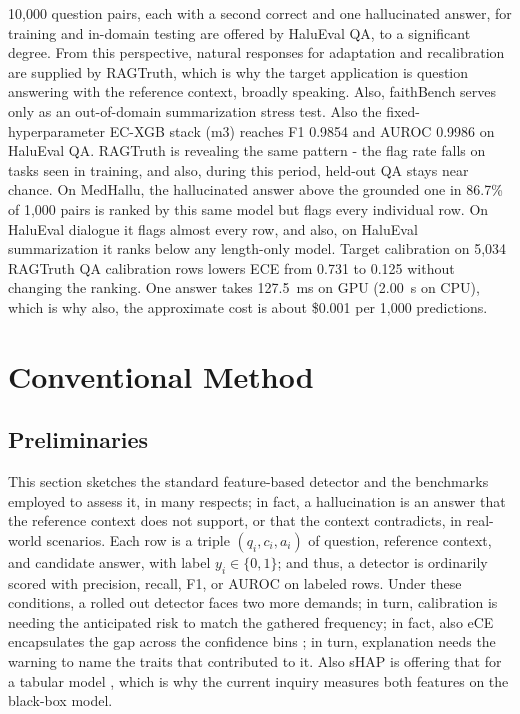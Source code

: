 \documentclass[a4paper,fleqn]{cas-sc}
\begin{document}
10,000 question pairs, each with a second correct and one hallucinated answer, for training and in-domain testing are offered by HaluEval QA, to a significant degree. From this perspective, natural responses for adaptation and recalibration are supplied by RAGTruth, which is why the target application is question answering with the reference context, broadly speaking. Also, faithBench serves only as an out-of-domain summarization stress test. Also the fixed-hyperparameter EC-XGB stack (m3) reaches F1 0.9854 and AUROC 0.9986 on HaluEval QA. RAGTruth is revealing the same pattern - the flag rate falls on tasks seen in training, and also, during this period, held-out QA stays near chance. On MedHallu, the hallucinated answer above the grounded one in 86.7\% of 1,000 pairs is ranked by this same model but flags every individual row. On HaluEval dialogue it flags almost every row, and also, on HaluEval summarization it ranks below any length-only model. Target calibration on 5,034 RAGTruth QA calibration rows lowers ECE from 0.731 to 0.125 without changing the ranking. One answer takes 127.5~ms on GPU (2.00~s on CPU), which is why also, the approximate cost is about \$0.001 per 1,000 predictions.

\section{Conventional Method}\label{sec:conventional}

\subsection{Preliminaries}

This section sketches the standard feature-based detector and the benchmarks employed to assess it, in many respects; in fact, a hallucination is an answer that the reference context does not support, or that the context contradicts, in real-world scenarios. Each row is a triple $(q_i,c_i,a_i)$ of question, reference context, and candidate answer, with label $y_i \in \{0,1\}$; and thus, a detector is ordinarily scored with precision, recall, F1, or AUROC on labeled rows. Under these conditions, a rolled out detector faces two more demands; in turn, calibration is needing the anticipated risk to match the gathered frequency; in fact, also eCE encapsulates the gap across the confidence bins \cite{guo}; in turn, explanation needs the warning to name the traits that contributed to it. Also sHAP is offering that for a tabular model \cite{shap}, which is why the current inquiry measures both features on the black-box model.
\end{document}
